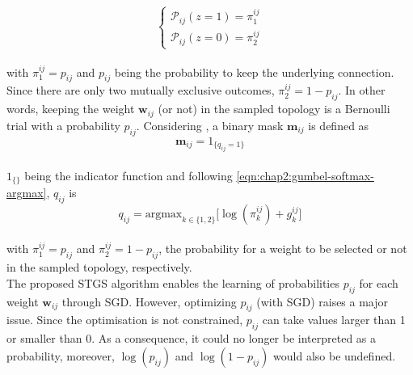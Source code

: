 \begin{equation}
    \left\{ \begin{array}{c}
    \mathcal{P}_{ij}(z=1)=\pi_1^{ij} \\ 
    \mathcal{P}_{ij}(z=0)=\pi_2^{ij}
    \end{array} \right.
\end{equation}\\

with $\pi_1^{ij}=p_{ij}$ and $p_{ij}$ being the probability to keep the
underlying connection. Since there are only two mutually exclusive outcomes,
$\pi_2^{ij}=1-p_{ij}$. In other words, keeping the weight $\bm{w}_{ij}$ (or
not) in the sampled topology is a Bernoulli trial with a probability $p_{ij}$.
Considering , a binary mask  $\bm{m}_{ij}$
is defined as\\

\begin{equation}
  \label{eqn:chap2:mask_value}
  \bm{m}_{ij} = 1_{\{q_{ij}=1\}}
\end{equation}\\
 
$1_{\{\}}$ being the indicator function and following
\cref{eqn:chap2:gumbel-softmax-argmax}, $q_{ij}$ is\\

\begin{equation}
  \label{eqn:chap2:q_ij_expression}
  q_{ij} = {\text{argmax}_{k \in \{1,2\}}}\big[\log(\pi_k^{ij})+g_k^{ij}\big]
\end{equation}\\

with $\pi^{ij}_1 = p_{ij}$ and $\pi^{ij}_2 = 1-p_{ij}$, the probability for a
weight to be selected or not in the sampled topology, respectively.\\

The proposed \ac{STGS} algorithm enables the learning of probabilities
$p_{ij}$ for each weight $\bm{w}_{ij}$ through \ac{SGD}. However, optimizing
$p_{ij}$ (with \ac{SGD}) raises a major issue. Since the optimisation is not
constrained, $p_{ij}$ can take values larger than 1 or smaller than 0. As a
consequence, it could no longer be interpreted as a probability, moreover,
$\log(p_{ij})$ and $\log(1-p_{ij})$ would also be undefined.\\

